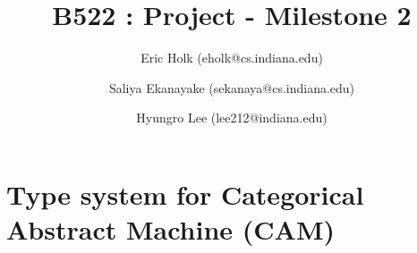 \documentclass{article}
\title{B522 : Project - Milestone 2}
\author{Eric Holk (eholk@cs.indiana.edu) \and Saliya Ekanayake (sekanaya@cs.indiana.edu) \and Hyungro Lee (lee212@indiana.edu)}
\begin{document}
\maketitle

\newcommand{\cons}{\ensuremath{\mathtt{cons}}}
\newcommand{\car}{\ensuremath{\mathtt{car}}}
\newcommand{\cdr}{\ensuremath{\mathtt{cdr}}}
\renewcommand{\null}{\ensuremath{\mathtt{null}}}
\newcommand{\nil}{\ensuremath{\mathtt{nil}}}
\newcommand{\nils}{\ensuremath{\mathit{nil}}}
\newcommand{\addone}{\ensuremath{\mathtt{add1}}}

\section{Type system for Categorical Abstract Machine (CAM)}
\end{document}
